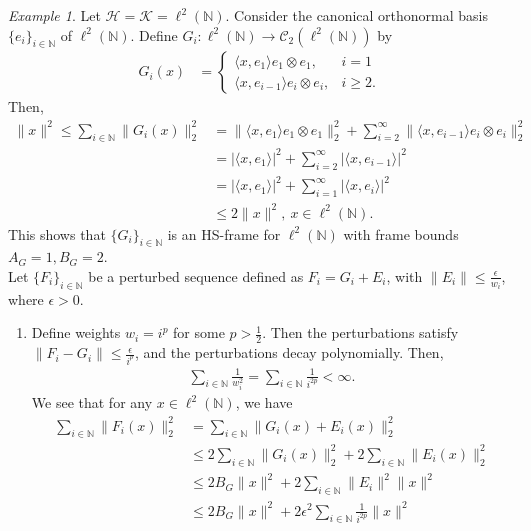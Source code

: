 \documentclass[reqno]{amsart}
\theoremstyle{plain}
\theoremstyle{remark}
\newtheorem{exa}[thm]{Example}
\numberwithin{equation}{section}
\begin{document}
\begin{exa} \label{exa2}
Let $\mathcal{H}=\mathcal{K}=\ell^2(\mathbb{N})$. Consider the canonical orthonormal basis $\{e_i\}_{i \in \mathbb{N}}$ of $\ell^2(\mathbb{N})$. Define $G_i :\ell^2(\mathbb{N}) \to \mathcal{C}_2(\ell^2(\mathbb{N}))$ by
\begin{align*}
    G_i(x) &= \begin{cases}
    \langle x, e_1 \rangle e_1 \otimes e_1, & i=1\\
    \langle x, e_{i-1} \rangle e_{i} \otimes e_{i}, & i \geq 2.
    \end{cases}
\end{align*}
Then,
\begin{align*}
\|x\|^2 \leq \sum_{i \in  \mathbb{N}}\|G_i(x)\|_2^2&= \| \langle x, e_1 \rangle e_1 \otimes e_1\|_2^2+\sum_{i=2}^\infty \| \langle x, e_{i-1} \rangle e_{i} \otimes e_{i}\|_2^2\\
&=| \langle x, e_1 \rangle |^2+\sum_{i =2}^\infty | \langle x, e_{i-1} \rangle|^2\\
&=| \langle x, e_1 \rangle |^2+\sum_{i =1}^\infty | \langle x, e_{i} \rangle|^2\\
& \leq 2 \|x\|^2, \ x \in \ell^2(\mathbb{N}).
\end{align*}
This shows that $\{G_i\}_{i \in \mathbb{N}}$ is an HS-frame for $\ell^2(\mathbb{N})$ with frame bounds $A_G = 1,  B_G = 2$.\\
Let $\{F_i\}_{i \in \mathbb{N}}$ be a perturbed sequence defined as $F_i = G_i + E_i$, with $\|E_i\| \leq \frac{\epsilon}{w_i}$, where $\epsilon > 0$.
\begin{enumerate}[$(a)$]
\item Define weights $w_i = i^p$ for some $p > \frac{1}{2}$.
Then the perturbations satisfy $\|F_i - G_i\| \leq \frac{\epsilon}{i^p}$, and the perturbations decay polynomially. Then,
\begin{align*}
\sum_{i \in \mathbb{N}} \frac{1}{w_i^2} = \sum_{i \in \mathbb{N}} \frac{1}{i^{2p}} < \infty.
\end{align*}
We see that for any $x \in \ell^2(\mathbb{N})$, we have
\begin{align*}
\sum_{i \in  \mathbb{N}} \|F_i(x)\|_2^2&=\sum_{i \in  \mathbb{N}} \|G_i (x)+ E_i(x)\|_2^2 \\
&\leq 2\sum_{i \in  \mathbb{N}} \|G_i (x)\|_2^2+2\sum_{i \in  \mathbb{N}} \|E_i (x)\|_2^2 \\
&\leq 2 B_G\|x\|^2+2\sum_{i \in  \mathbb{N}} \|E_i\|^2 \|x\|^2\\
&\leq 2 B_G\|x\|^2+2\epsilon^2 \sum_{i \in  \mathbb{N}} \frac{1}{i^{2p}} \|x\|^2\\

\end{align*}
\end{enumerate}
\end{exa}
\end{document}
